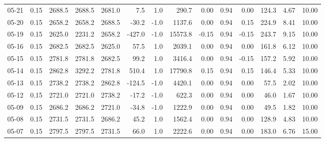 \begin{threeparttable}
{\begin{tabular}{lrrrrrrrrrrrrr}
  05-21 &     0.15 & 2688.5 & 2688.5 & 2681.0 &        7.5 &                      1.0 &               290.7 &       0.00 &      0.94 &           0.00 &            124.3 &            4.67 &                  10.00 \\
  05-20 &     0.15 & 2658.2 & 2658.2 & 2688.5 &      -30.2 &                     -1.0 &              1137.6 &       0.00 &      0.94 &           0.15 &            224.9 &            8.41 &                  10.00 \\
  05-19 &     0.15 & 2625.0 & 2231.2 & 2658.2 &     -427.0 &                     -1.0 &             15573.8 &      -0.15 &      0.94 &          -0.15 &            243.7 &            9.15 &                  10.00 \\
  05-16 &     0.15 & 2682.5 & 2682.5 & 2625.0 &       57.5 &                      1.0 &              2039.1 &       0.00 &      0.94 &           0.00 &            161.8 &            6.12 &                  10.00 \\
  05-15 &     0.15 & 2781.8 & 2781.8 & 2682.5 &       99.2 &                      1.0 &              3416.4 &       0.00 &      0.94 &          -0.15 &            157.2 &            5.92 &                  10.00 \\
  05-14 &     0.15 & 2862.8 & 3292.2 & 2781.8 &      510.4 &                      1.0 &             17790.8 &       0.15 &      0.94 &           0.15 &            146.4 &            5.33 &                  10.00 \\
  05-13 &     0.15 & 2738.2 & 2738.2 & 2862.8 &     -124.5 &                     -1.0 &              4420.1 &       0.00 &      0.94 &           0.00 &             57.5 &            2.02 &                  10.00 \\
  05-12 &     0.15 & 2721.0 & 2721.0 & 2738.2 &      -17.2 &                     -1.0 &               622.3 &       0.00 &      0.94 &           0.00 &             46.0 &            1.67 &                  10.00 \\
  05-09 &     0.15 & 2686.2 & 2686.2 & 2721.0 &      -34.8 &                     -1.0 &              1222.9 &       0.00 &      0.94 &           0.00 &             49.5 &            1.82 &                  10.00 \\
  05-08 &     0.15 & 2731.5 & 2731.5 & 2686.2 &       45.2 &                      1.0 &              1562.4 &       0.00 &      0.94 &           0.00 &            128.9 &            4.83 &                  10.00 \\
  05-07 &     0.15 & 2797.5 & 2797.5 & 2731.5 &       66.0 &                      1.0 &              2222.6 &       0.00 &      0.94 &           0.00 &            183.0 &            6.76 &                  15.00 \\

\end{tabular}}
\end{threeparttable}

